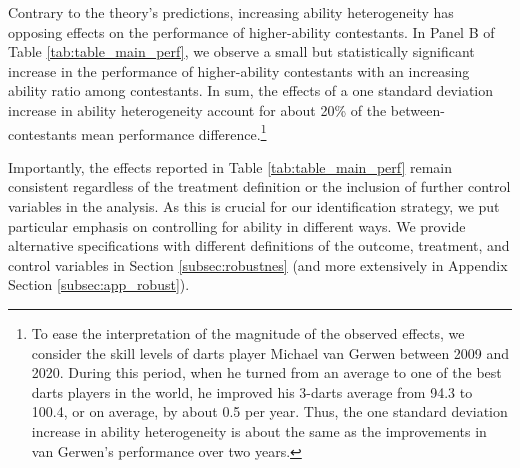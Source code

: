 \documentclass[11pt,a4paper]{article}
\begin{document}
Contrary to the theory's predictions, increasing ability heterogeneity has opposing effects on the performance of higher-ability contestants. In Panel B of Table \ref{tab:table_main_perf}, we observe a small but statistically significant increase in the performance of higher-ability contestants with an increasing ability ratio among contestants. 
In sum, the effects of a one standard deviation increase in ability heterogeneity account for about 20\% of the between-contestants mean performance difference.\footnote{To ease the interpretation of the magnitude of the observed effects, we consider the skill levels of darts player Michael van Gerwen between 2009 and 2020. During this period, when he turned from an average to one of the best darts players in the world, he improved his 3-darts average from 94.3 to 100.4, or on average, by about 0.5 per year. Thus, the one standard deviation increase in ability heterogeneity is about the same as the improvements in van Gerwen's performance over two years.} \par

Importantly, the effects reported in Table \ref{tab:table_main_perf} remain consistent regardless of the treatment definition or the inclusion of further control variables in the analysis. As this is crucial for our identification strategy, we put particular emphasis on controlling for ability in different ways. We provide alternative specifications with different definitions of the outcome, treatment, and control variables in Section \ref{subsec:robustnes} (and more extensively in Appendix Section \ref{subsec:app_robust}).\par
\end{document}
